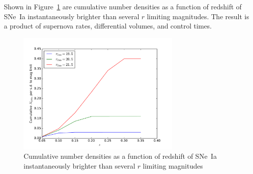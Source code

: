 \documentclass{article}   	%
\begin{document}
Shown in Figure~\ref{cum:fig} are cumulative number densities as a function of redshift of SNe~Ia instantaneously brighter than several $r$ limiting magnitudes. 
The result is a product of supernova rates, differential volumes, and control times.

\begin{figure}[h]
\includegraphics[width=8cm]{../src/cumulative.pdf}
\centering
\caption{Cumulative number densities as a function of redshift of SNe~Ia instantaneously brighter than several $r$ limiting magnitudes
\label{cum:fig}}
\end{figure}
\end{document}
